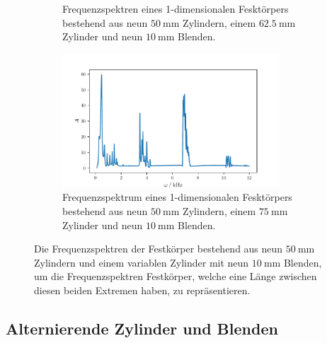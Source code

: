 \begin{figure}
\begin{subfigure}{0.48\textwidth}
        \caption{Frequenzspektren eines 1-dimensionalen Fesktörpers bestehend aus neun $\qty{50}{\milli\meter}$ Zylindern, einem 
        $\qty{62.5}{\milli\meter}$ Zylinder und neun $\qty{10}{\milli\meter}$ Blenden.}%
        \label{fig:10c9b625}
    \end{subfigure}%
    \hfill
    \begin{subfigure}{0.48\textwidth}%
        \centering%
        \includegraphics[height=5cm]{build/10c9b75.pdf}%
        \caption{Frequenzspektrum eines 1-dimensionalen Fesktörpers bestehend aus neun $\qty{50}{\milli\meter}$ Zylindern, einem 
        $\qty{75}{\milli\meter}$ Zylinder und neun $\qty{10}{\milli\meter}$ Blenden.}%
        \label{fig:10c9b75}
    \end{subfigure}%
    \caption{Die Frequenzspektren der Festkörper bestehend aus neun $\qty{50}{\milli\meter}$ Zylindern und einem variablen Zylinder mit neun $\qty{10}{\milli\meter}$ Blenden, um die 
            Frequenzspektren Festkörper, welche eine Länge zwischen diesen beiden Extremen haben, zu repräsentieren.}%
    \label{fig:austauschen}
\end{figure}%
\FloatBarrier

\subsection{Alternierende Zylinder und Blenden}
\label{sub:alternating}
